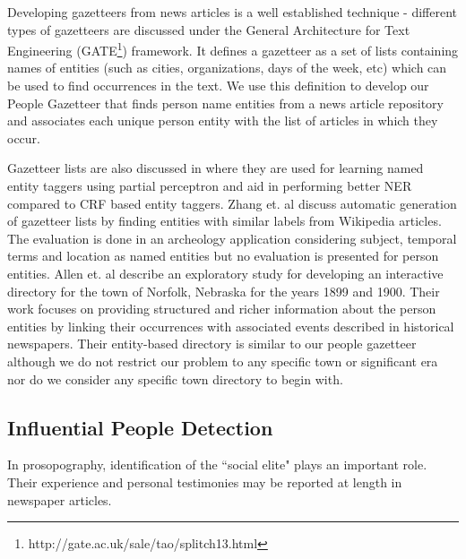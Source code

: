Developing gazetteers from news articles is a well established technique - different types of gazetteers are discussed under the General Architecture for Text Engineering (GATE\footnote{http://gate.ac.uk/sale/tao/splitch13.html}) framework. It defines a gazetteer as a set of lists containing names of entities (such as cities, organizations, days of the week, etc) which can be used to find occurrences in the text. We use this definition to develop our People Gazetteer that finds person name entities from a news article repository and associates each unique person entity with the list of articles in which they occur.

Gazetteer lists are also discussed in \cite{carlson2009learning} where they are used for learning named entity taggers using partial perceptron and aid in performing better NER compared to CRF based entity taggers. Zhang et. al\cite{zhang2009novel} discuss automatic generation of gazetteer lists by finding entities with similar labels from Wikipedia articles. The evaluation is done in an archeology application considering subject, temporal terms and location as named entities but no evaluation is presented for person entities. Allen et. al \cite{allen2013toward} describe an exploratory study for developing an interactive directory for the town of Norfolk, Nebraska for the years 1899 and 1900. Their work focuses on providing structured and richer information about the person entities by linking their occurrences with associated events described in historical newspapers. Their entity-based directory is similar to our people gazetteer although we do not restrict our problem to any specific town or significant era nor do we consider any specific town directory to begin with. 

\subsection{Influential People Detection}
In prosopography, identification of the ``social elite" plays an important role. Their experience and personal testimonies may be reported at length in newspaper articles. 

